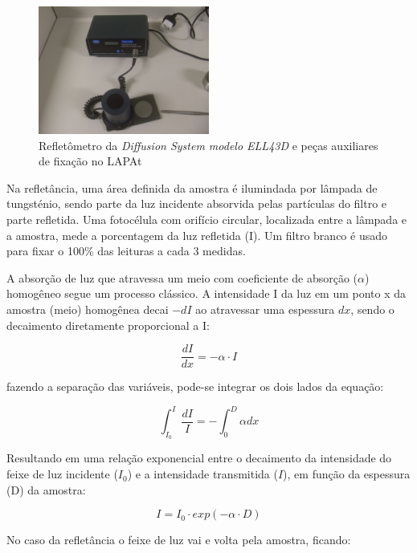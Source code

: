 \begin{figure}[H]
  \centering
  \includegraphics[width=0.5\textwidth]{../inputs/images/refletometro.jpg}
  \caption{Refletômetro da \textit{Diffusion System modelo ELL43D}
           e peças auxiliares de fixação no LAPAt}
\end{figure}

Na refletância, uma área definida da amostra é ilumindada por lâmpada de 
tungsténio, sendo parte da luz incidente absorvida pelas partículas do 
filtro e parte refletida. Uma fotocélula com orifício circular, localizada
entre a lâmpada e a amostra, mede a porcentagem da luz refletida (I).
Um filtro branco é usado para fixar o 100\% das leituras a cada 3 medidas.

A absorção de luz que atravessa um meio com coeficiente de absorção ($\alpha$) 
homogêneo segue um processo clássico. A intensidade I da luz em um ponto x da
amostra (meio) homogênea decai $-dI$ ao atravessar uma espessura $dx$, 
sendo o decaimento diretamente proporcional a I:

\begin{equation}
  \label{eq:dIdx}
   \frac{dI}{dx} = -\alpha \cdot I
\end{equation}

fazendo a separação das variáveis, pode-se integrar os dois lados da equação:

\begin{equation}
  \int_{I_0}^{I} \frac{dI}{I} = - \int_{0}^{D} \alpha dx
\end{equation}

Resultando em uma relação exponencial entre o decaimento da intensidade do feixe
de luz incidente ($I_0$) e a intensidade transmitida ($I$), 
em função da espessura (D) da amostra:

\begin{equation}
  \label{eq:I_BC}
  I = I_0 \cdot exp(-\alpha \cdot D)
\end{equation}

No caso da refletância o feixe de luz vai e volta pela amostra, ficando:

